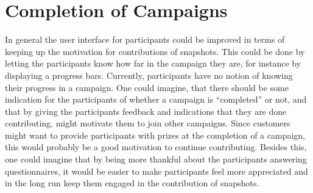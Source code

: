 
\section{Completion of Campaigns}
\label{sec:completion_of_campaigns}

In general the user interface for participants could be improved in terms of keeping up the motivation for contributions of snapshots. This could be done by letting the participants know how far in the campaign they are, for instance by displaying a progress bars. Currently, participants have no notion of knowing their progress in a campaign. One could imagine, that there should be some indication for the participants of whether a campaign is  ``completed'' or not, and that by giving the participants feedback and indications that they are done contributing, might motivate them to join other campaigns. Since customers might want to provide participants with prizes at the completion of a campaign, this would probably be a good motivation to continue contributing. Besides this, one could imagine that by being more thankful about the participants answering questionnaires, it would be easier to make participants feel more appreciated and in the long run keep them engaged in the contribution of snapshots.